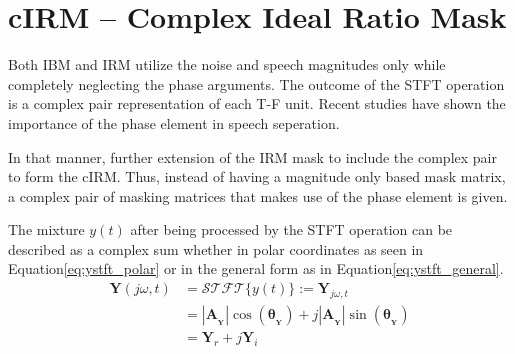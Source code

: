 \section{cIRM -- Complex Ideal Ratio Mask}\label{ssec:cirm}
Both IBM and IRM utilize the noise and speech magnitudes only
while completely neglecting the phase arguments.
The outcome of the STFT operation is a complex pair
representation of each T-F unit. Recent studies
have shown the importance of 
the phase element in 
speech seperation\cite{7364200,Xia2017UsingOR}.

In that manner, further extension of the IRM mask 
to include the complex pair to form the cIRM. 
Thus, instead of having a magnitude only based mask matrix, a complex
pair of masking matrices that makes use of the phase element is given.

The mixture \(y(t)\) after being processed by
the STFT operation can be described as a complex sum
whether in polar coordinates as seen in Equation\;\ref{eq:ystft_polar}
or in the general form as in Equation\;\ref{eq:ystft_general}.
\begin{align}\label{eq:ystft_polar}
    \mathbf{Y}(j\omega, t)  & = \mathcal{STFT} \{ y(t) \} := \mathbf{Y}_{j\omega, t} \nonumber \\
                            & = |\mathbf{A}_{_{\mathbf{Y}}}|\cos(\bm{\theta}_{_{\mathbf{Y}}}) 
                            + j|\mathbf{A}_{_{\mathbf{Y}}}|\sin(\bm{\theta}_{_{\mathbf{Y}}}) \\
\label{eq:ystft_general}      & = \mathbf{Y}_{r} + j\mathbf{Y}_{i}
\end{align}

